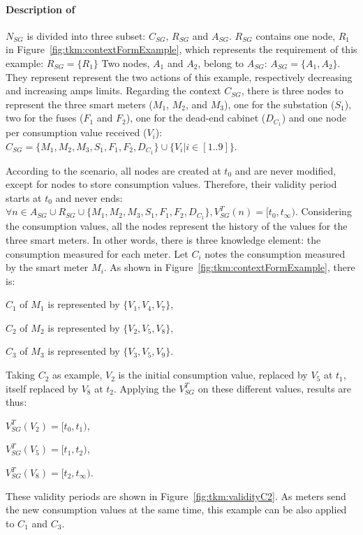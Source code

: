 \paragraph{Description of }

$N_{SG}$ is divided into three subset: $C_{SG}$, $R_{SG}$ and $A_{SG}$.
$R_{SG}$ contains one node, $R_1$ in Figure~\ref{fig:tkm:contextFormExample}, which represents the requirement of this example: $R_{SG} = \{R_1\}$
Two nodes, $A_1$ and $A_2$, belong to $A_{SG}$: $A_{SG} = \{ A_1, A_2\}$.
They represent represent the two actions of this example, respectively decreasing and increasing amps limits.
Regarding the context $C_{SG}$, there is three nodes to represent the three smart meters ($M_1$, $M_2$, and $M_3$), one for the substation ($S_1$), two for the fuses ($F_1$ and $F_2$), one for the dead-end cabinet ($D_{C_1}$) and one node per consumption value received ($V_i$): $C_{SG} = \{M_1, M_2, M_3, S_1, F_1, F_2, D_{C_1}\} \cup \{ V_i | i \in [1..9]\}$.

According to the scenario, all nodes are created at $t_0$ and are never modified, except for nodes to store consumption values.
Therefore, their validity period starts at $t_0$ and never ends: $\forall n \in A_{SG} \cup R_{SG} \cup \{M_1, M_2, M_3, S_1, F_1, F_2, D_{C_1}\}, V^T_{SG}(n) = [t_0, t_\infty)$.
Considering the consumption values, all the nodes represent the history of the values for the three smart meters.
In other words, there is three knowledge element: the consumption measured for each meter.
Let $C_i$ notes the consumption measured by the smart meter $M_i$.
As shown in Figure~\ref{fig:tkm:contextFormExample}, there is:
\begin{condItemize}
	\item $C_1$ of $M_1$ is represented by $\{V_1, V_4, V_7\}$,
	\item $C_2$ of $M_2$ is represented by $\{V_2, V_5, V_8\}$,
	\item $C_3$ of $M_3$ is represented by $\{V_3, V_5, V_9\}$.
\end{condItemize}
Taking $C_2$ as example, $V_2$ is the initial consumption value, replaced by $V_5$ at $t_1$, itself replaced by $V_8$ at $t_2$. 
Applying the $V_{SG}^T$ on these different values, results are thus:
\begin{condItemize}
	\item $V_{SG}^T(V_2) = [t_0, t_1)$,
	\item $V_{SG}^T(V_5) = [t_1, t_2)$,
	\item $V_{SG}^T(V_8) = [t_2, t_\infty)$.
\end{condItemize}
These validity periods are shown in Figure~\ref{fig:tkm:validityC2}.
As meters send the new consumption values at the same time, this example can be also applied to $C_1$ and $C_3$.

